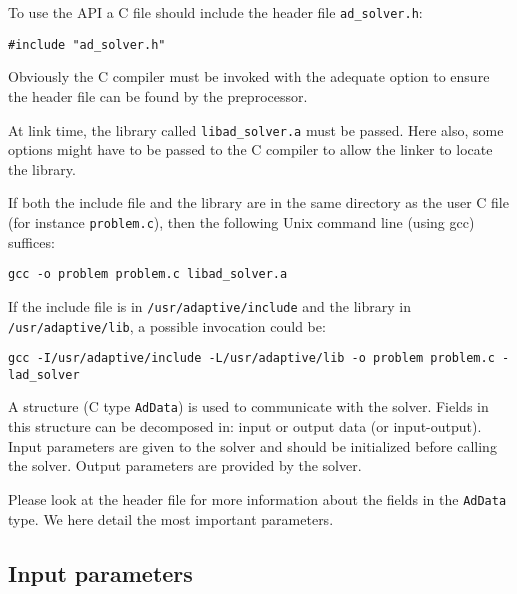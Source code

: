 \documentclass{article}
\newenvironment{Indentation}%
   {\begin{list}{}{}%
      \item }%
   {\end{list}}
\newenvironment{Code}%
   {\begin{Indentation}\begin{tt}}%
   {\end{tt}\end{Indentation}}
\begin{document}
To use the API a C file should include the header file
\texttt{ad\_solver.h}:

\begin{Code}
\begin{verbatim}
#include "ad_solver.h"
\end{verbatim}
\end{Code}

Obviously the C compiler must be invoked with the adequate option to ensure
the header file can be found by the preprocessor.

At link time, the library called \texttt{libad\_solver.a} must be
passed. Here also, some options might have to be passed to the C compiler to
allow the linker to locate the library.

If both the include file and the library are in the same directory as the
user C file (for instance \texttt{problem.c}), then the following Unix command
line (using gcc) suffices:

\begin{Code}
\begin{verbatim}
gcc -o problem problem.c libad_solver.a
\end{verbatim}
\end{Code}

If the include file is in \texttt{/usr/adaptive/include} and the library in
 \texttt{/usr/adaptive/lib}, a possible invocation could be:

\begin{Code}
\begin{verbatim}
gcc -I/usr/adaptive/include -L/usr/adaptive/lib -o problem problem.c -lad_solver
\end{verbatim}
\end{Code}

A structure (C type  \texttt{AdData}) is used to communicate with the solver. Fields in this structure can be decomposed in: input or output data (or input-output). Input parameters are given to the solver and should be initialized before calling the solver. Output parameters are provided by the solver.

Please look at the header file for more information about the fields in the
\texttt{AdData} type. We here detail the most important parameters.




\subsection{Input parameters}
\end{document}
